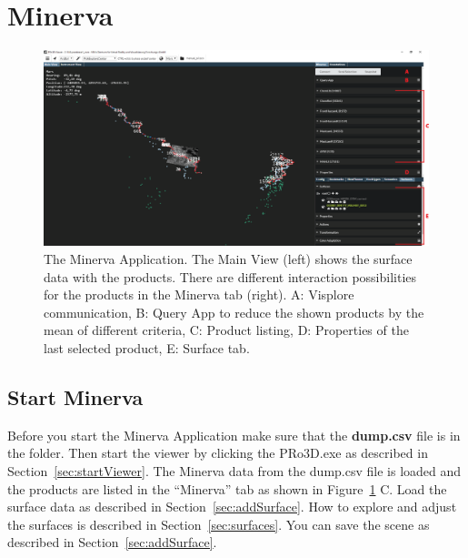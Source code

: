 \section{Minerva}

\begin{figure}[h]
    	\centering
    		\includegraphics[width=1\textwidth]{pics/MinervaAI.png}
    	\caption[Start Minerva]{The Minerva Application. The Main View (left) shows the surface data with the products. There are different interaction possibilities for the products in the Minerva tab (right). A: Visplore communication, B: Query App to reduce the shown products by the mean of different criteria, C: Product listing, D: Properties of the last selected product, E: Surface tab.  }
    	\label{fig:StartMinerva}
   \end{figure}

\subsection{Start Minerva}
\label{sec:startMinerva}

Before you start the Minerva Application make sure that the \textbf{dump.csv} file is in the \textbf{} folder.
Then start the viewer by clicking the PRo3D.exe as described in Section~\ref{sec:startViewer}. The Minerva data from the dump.csv file is loaded and the products are listed in the ``Minerva'' tab as shown in Figure~\ref{fig:StartMinerva} C.  Load the surface data as described in Section~\ref{sec:addSurface}.
How to explore and adjust the surfaces is described in Section~\ref{sec:surfaces}.
You can save the scene as described in Section~\ref{sec:addSurface}.

